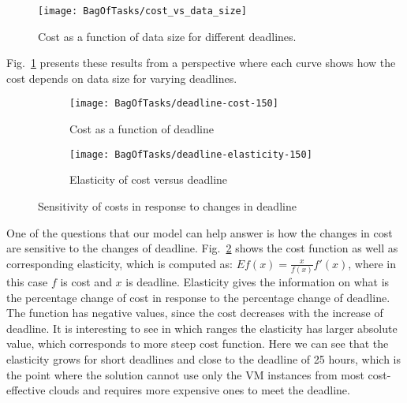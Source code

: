 {  \begin{figure}[tb]
     \centering \texttt{[image: BagOfTasks/cost\_vs\_data\_size]}
     \caption{Cost as a function of data size for different
     deadlines.\label{fig:bot:cost_vs_data_size}}
  \end{figure} 
  
  Fig.~\ref{fig:bot:cost_vs_data_size} presents these results from a perspective
  where each curve shows how the cost depends on data size for varying
  deadlines.
  
  \begin{figure}[tb]
     \centering 
     \begin{subfigure}[b]{0.49\textwidth}
       \centering       
       \texttt{[image: BagOfTasks/deadline-cost-150]}
       \caption{Cost as a function of deadline}
     \end{subfigure}     
     \begin{subfigure}[b]{0.49\textwidth}
       \centering       
       \texttt{[image: BagOfTasks/deadline-elasticity-150]}
       \caption{Elasticity of cost versus deadline}
     \end{subfigure}     
     \caption{Sensitivity of costs in response to changes in deadline}
     \label{fig:bot:elasticity}
  \end{figure} 
  One of the questions that our model can help answer is how the changes in
  cost are sensitive to the changes of deadline. Fig.~\ref{fig:bot:elasticity} shows
  the cost function as well as corresponding elasticity, which is computed as:
  $E f(x) = \frac{x}{f(x)} f'(x)$, where in this case $f$ is cost and $x$ is
  deadline. Elasticity gives the information on what is the percentage change
  of cost in response to the percentage change of deadline. The function has
  negative values, since the cost decreases with the increase of deadline. It
  is interesting to see in which ranges the elasticity has larger absolute
  value, which corresponds to more steep cost function. Here we can see that
  the elasticity grows for short deadlines and close to the deadline of 25
  hours, which is the point where the solution cannot use only the VM instances
  from most cost-effective clouds and requires more expensive ones to meet the
  deadline.
  
}

